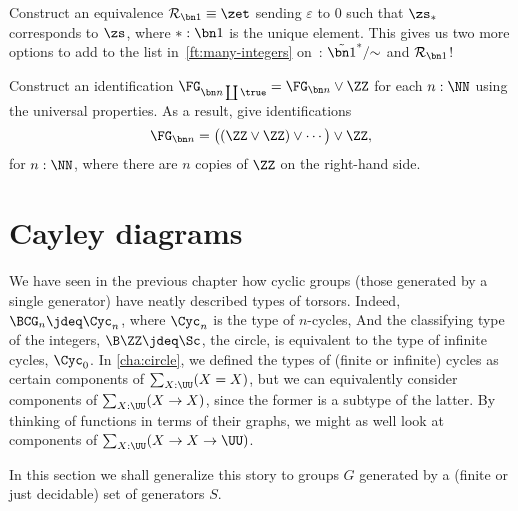 \begin{xca}
  Construct an equivalence $\mathcal R_{\bn 1} \equiv \zet$
  sending $\varepsilon$ to $0$ such that $\zs_*$ corresponds to $\zs$,
  where $*:\bn 1$ is the unique element.
  This gives us two more options to add to the list in~\cref{ft:many-integers}
  on~: $\tilde{\bn 1}^*/{\sim}$ and $\mathcal R_{\bn 1}$!
\end{xca}

\begin{xca}
  Construct an identification $\FG_{\bn n \coprod \true} = \FG_{\bn n}
  \vee \ZZ$ for each $n : \NN$ using the universal properties.
  As a result, give identifications
  \[
    \FG_{\bn n} = \bigl((\ZZ \vee \ZZ) \vee \cdots\bigr) \vee \ZZ,
  \]
  for $n:\NN$, where there are $n$ copies of $\ZZ$ on the right-hand side.
\end{xca}

\section{Cayley diagrams}
\label{sec:cayley-diagrams}

We have seen in the previous chapter how cyclic groups
(those generated by a single generator)
have neatly described types of torsors.
Indeed, $\BCG_n \jdeq \Cyc_n$, where $\Cyc_n$ is the type of $n$-cycles,
And the classifying type of the integers, $\B\ZZ\jdeq\Sc$, \ie the circle,
is equivalent to the type of infinite cycles, $\Cyc_0$.
In \cref{cha:circle}, we defined the types of (finite or infinite)
cycles as certain components of $\sum_{X:\UU}(X=X)$,
but we can equivalently consider components of $\sum_{X:\UU}(X\to X)$,
since the former is a subtype of the latter.
By thinking of functions in terms of their graphs,
we might as well look at components of $\sum_{X:\UU}(X \to X \to \UU)$.

In this section we shall generalize this story
to groups $G$ generated by a
(finite or just decidable)
set of generators $S$.



